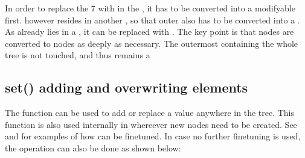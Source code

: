\documentclass[a4paper,10pt,english]{sphinxmanual}
\begin{document}
\sphinxAtStartPar
In order to replace the 7 with  in the  , it has to be converted into a modifyable  first.  however resides in another  , so that outer  also has to be converted into a . As  already lies in a , it can be  replaced with \sphinxcode{\sphinxupquote{{[}5, {[}6, "seven"{]}{]}}}. The key point is that \sphinxhyphen{}nodes are converted to \sphinxhyphen{}nodes as deeply as necessary. The outermost  containing the whole tree  is not touched, and thus remains a 


\subsection{set() \textendash{} adding and overwriting elements}
\label{\detokenize{README:set-adding-and-overwriting-elements}}
\sphinxAtStartPar
The  function can be used to add or replace a value anywhere in the tree. This function is also used internally in  whereever new nodes need to be created. See {\hyperref[\detokenize{README:basic-principles-for-modifying-the-tree}]{}} and {\hyperref[\detokenize{README:node-types}]{}} for examples of how  can be fine\sphinxhyphen{}tuned. In case no further fine\sphinxhyphen{}tuning is used, the \sphinxhyphen{}operation can also be done as shown below:
\end{document}
